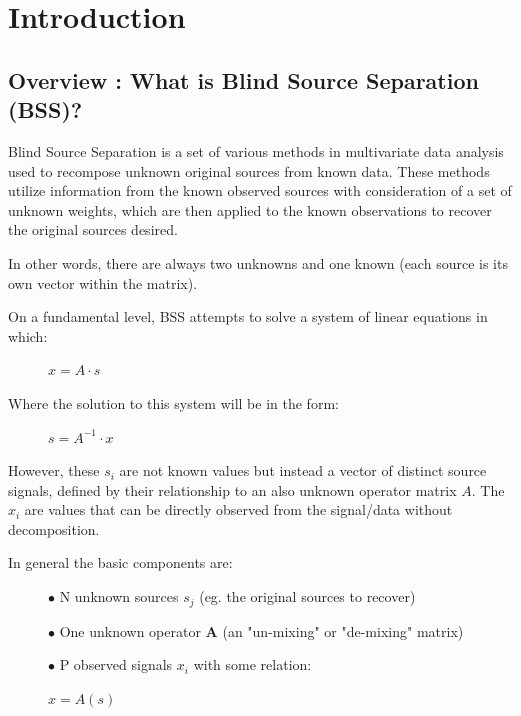 \documentclass[12pt,twoside]{amherstthesis}
\begin{document}
  \chapter*{Introduction}\label{introduction}
  
  \section{Overview : What is Blind Source Separation
  (BSS)?}\label{overview-what-is-blind-source-separation-bss}
  
  Blind Source Separation is a set of various methods in multivariate data
  analysis used to recompose unknown original sources from known data.
  These methods utilize information from the known observed sources with
  consideration of a set of unknown weights, which are then applied to the
  known observations to recover the original sources desired.
  
  In other words, there are always two unknowns and one known (each source
  is its own vector within the matrix).
  
  On a fundamental level, BSS attempts to solve a system of linear
  equations in which:
  
  \begin{figure}[h]
    
    \centering
  $x = A\cdot s$ 
  
  \end{figure}
  
  Where the solution to this system will be in the form:
  
  \begin{figure}[h]
    
    \centering
  $s = A^{-1}\cdot x$
  \end{figure}
  
  However, these \(s_i\) are not known values but instead a vector of
  distinct source signals, defined by their relationship to an also
  unknown operator matrix \(A\). The \(x_i\) are values that can be
  directly observed from the signal/data without decomposition.
  
  In general the basic components are:
  
  \begin{figure}[h]
    
  
    $\bullet$ N unknown sources $s_j$ (eg. the original sources to recover) \newline
    
    
    $\bullet$ One unknown operator $\textbf{A}$ (an "un-mixing" or "de-mixing" matrix) \newline
    
    
    $\bullet$ P observed signals $x_i$ with some relation: \newline
    
    \centering $\textbf{$x = A(s)$}$
  
  \end{figure}
  
\end{document}
